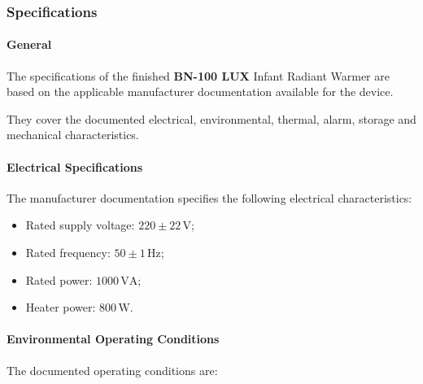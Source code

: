 
\hypertarget{p3-3-4-1}{}

\subsubsection{Specifications}

\paragraph{General}

The specifications of the finished \textbf{BN-100 LUX} Infant Radiant
Warmer are based on the applicable manufacturer documentation
available for the device.

They cover the documented electrical, environmental, thermal,
alarm, storage and mechanical characteristics.


\paragraph{Electrical Specifications}

The manufacturer documentation specifies the following electrical
characteristics:

\begin{itemize}
    \item Rated supply voltage: \(220 \pm 22\,\mathrm{V}\);
    \item Rated frequency: \(50 \pm 1\,\mathrm{Hz}\);
    \item Rated power: \(1000\,\mathrm{VA}\);
    \item Heater power: \(800\,\mathrm{W}\).
\end{itemize}


\paragraph{Environmental Operating Conditions}

The documented operating conditions are:

